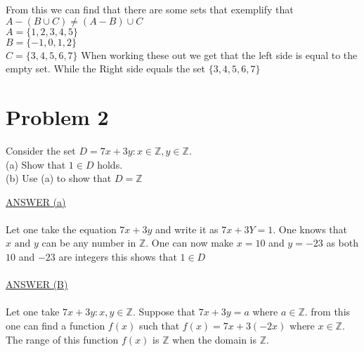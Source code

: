 \documentclass[12pt]{article}
\begin{document}
From this we can find that there are some sets that exemplify that $A-(B\cup C) \neq (A-B)\cup C$\\
$A = \{1,2,3,4,5\}$\\
$B = \{-1,0,1,2\}$\\
$C = \{3,4,5,6,7\}$
When working these out we get that the left side is equal to the empty set. While the Right side equals the set $\{3,4,5,6,7\}$

\section*{Problem 2}\label{Problem 2}
\begin{center}
        Consider the set $D = {7x+3y : x \in \mathbb{Z}, y \in \mathbb{Z}}$. \\
        (a) Show that $1 \in D$ holds.\\
        (b) Use (a) to show that $D = \mathbb{Z}$ \\
\end{center}
\underline{ANSWER (a)}\\
\\Let one take the equation $7x+3y$ and write it as $7x+3Y = 1$.
One knows that $x \text{ and } y$ can be any number in $\mathbb{Z}$.
One can now make $x=10$ and $y=-23$ as both $10$ and $-23$ are integers this shows that $1 \in D$\\
\\\underline{ANSWER (B)}\\
\\ Let one take $7x + 3y : x,y \in \mathbb{Z}$. Suppose that $7x+3y = a$ where $a\in \mathbb{Z}$.
from this one can find a function $f(x)$ such that $f(x) = 7x+3(-2x)$ where $x \in \mathbb{Z}$.
The range of this function $f(x)$ is $\mathbb{Z}$ when the domain is $\mathbb{Z}$.
\end{document}
